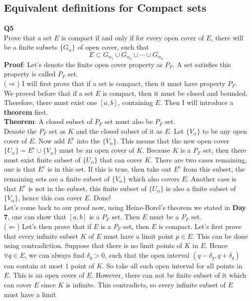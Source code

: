 \documentclass{article}
\newcommand{\tb}[1]{\textbf{#1}}
\newcommand{\al}{\alpha}
\begin{document}
\subsection{Equivalent definitions for Compact sets}
\tb{Q5}\\
Prove that a set $E$ is compact if and only if for every open cover of $E$, there will be a finite subsets $\{G_\alpha\}$ of open cover, such that
$$
E \subset G_{\al_1} \cup G_{\al_2} \cup \cdots \cup G_{\al_n}
$$ 
\tb{Proof}: Let's denote the finite open cover property as $P_F$. A set satisfies this property is called $P_F$ set. \\
($\Longrightarrow$) I will first prove that if a set is compact, then it must have property $P_F$. We proved before that if a set $E$ is compact, then it 
must be closed and bounded. Therefore, there must exist one $[a, b]$, containing $E$. Then I will introduce a \tb{theorem} first. \\
\tb{Theorem}: A closed subset of $P_F$ set must also be $P_F$ set.\\
Denote the $P_F$ set as $K$ and the closed subset of it as $E$. Let $\{V_\al\}$ to be any open cover of $E$. Now add $E^c$ into the $\{V_\al\}$. This means that the new open cover $\{U_\al\} = E^c \cup \{V_\al\}$
must be an open cover of $K$. Because $K$ is a $P_F$ set, then there must exist finite subset of $\{U_\al\}$ that can cover $K$. There are two cases remaining, one is that $E^c$ is in this set. If this is true, 
then take out $E^c$ from this subset, the remaining sets are a finite subset of $\{V_\al\}$ which also covers $E$. Another case is that $E^c$ is not in the subset, this finite subset of $\{U_\al\}$ is also a finite 
subset of $\{V_\al\}$, hence this can cover $E$. Done!\\
Let's come back to our proof now, using Heine-Borel's theorem we stated in \tb{Day 7}, one can show that $[a,b]$ is a $P_F$ set. Then $E$ must be a $P_F$ set.\\
($\Longleftarrow$) Let's then prove that if $E$ is a $P_F$ set, then $E$ is compact. Let's first prove that every infinite subset $K$ of $E$ must have a limit point $p \in E$. This can be done using contradiction. Suppose 
that there is no limit points of $K$ in $E$. Hence $\forall q \in E$, we can always find $\delta_q > 0 $, such that the open interval $(q - \delta_q, q + \delta_q)$ can contain at most $1$ point of $K$. So take all such 
open interval for all points in $E$. This is an open cover of $E$. However, there can not be finite subset of it which can cover $E$ since $K$ is infinite. This contradicts, so every infinite subset of $E$ must have a limit 
\end{document}
